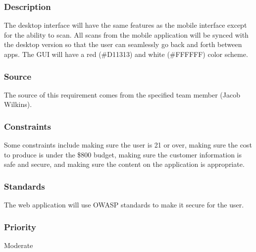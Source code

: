 \subsubsection{Description}
The desktop interface will have the same features as the mobile interface except for the ability to scan. All scans from the mobile application will be synced with the desktop version so that the user can seamlessly go back and forth between apps. The GUI will have a red (\#D11313) and white (\#FFFFFF) color scheme.
\subsubsection{Source}
The source of this requirement comes from the specified team member (Jacob Wilkins).
\subsubsection{Constraints}
Some constraints include making sure the user is 21 or over, making sure the cost to produce is under the \$800 budget, making sure the customer information is safe and secure, and making sure the content on the application is appropriate.
\subsubsection{Standards}
The web application will use OWASP standards to make it secure for the user.
\subsubsection{Priority}
Moderate
